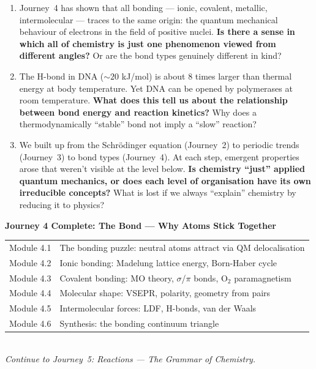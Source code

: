 \documentclass[12pt, a4paper]{book}
\begin{document}
\begin{reflectionbox}
\begin{enumerate}[label=\textbf{R\arabic*.}]
  \item Journey~4 has shown that all bonding --- ionic,
    covalent, metallic, intermolecular --- traces to the
    same origin: the quantum mechanical behaviour of electrons
    in the field of positive nuclei.
    \textbf{Is there a sense in which all of chemistry is
    just one phenomenon viewed from different angles?}
    Or are the bond types genuinely different in kind?

  \item The H-bond in DNA ($\sim 20$ kJ/mol) is about 8 times
    larger than thermal energy at body temperature.
    Yet DNA can be opened by polymerases at room temperature.
    \textbf{What does this tell us about the relationship
    between bond energy and reaction kinetics?}
    Why does a thermodynamically ``stable'' bond not imply
    a ``slow'' reaction?

  \item We built up from the Schr\"{o}dinger equation
    (Journey~2) to periodic trends (Journey~3)
    to bond types (Journey~4).
    At each step, emergent properties arose that weren't
    visible at the level below.
    \textbf{Is chemistry ``just'' applied quantum mechanics,
    or does each level of organisation have its own
    irreducible concepts?}
    What is lost if we always ``explain'' chemistry by reducing
    it to physics?
\end{enumerate}
\end{reflectionbox}

\vspace{1.5em}
\begin{center}
\begin{tcolorbox}[enhanced,
  colback=JourneyColor!12, colframe=JourneyColor,
  width=0.9\textwidth, arc=4pt]
\centering\sffamily
\textbf{\large Journey 4 Complete: The Bond --- Why Atoms Stick Together}\\[8pt]
\small
\begin{tabular}{ll}
Module 4.1 & The bonding puzzle: neutral atoms attract via QM delocalisation \\
Module 4.2 & Ionic bonding: Madelung lattice energy, Born-Haber cycle \\
Module 4.3 & Covalent bonding: MO theory, $\sigma$/$\pi$ bonds, O$_2$ paramagnetism \\
Module 4.4 & Molecular shape: VSEPR, polarity, geometry from pairs \\
Module 4.5 & Intermolecular forces: LDF, H-bonds, van der Waals \\
Module 4.6 & Synthesis: the bonding continuum triangle \\
\end{tabular}\\[8pt]
\textit{Continue to Journey~5: Reactions --- The Grammar of Chemistry.}
\end{tcolorbox}
\end{center}
\end{document}

